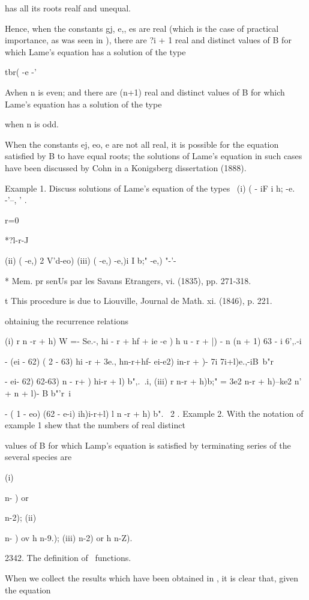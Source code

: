 {{{{has all its roots realf and unequal.

Hence, when the constants gj, e,, es are real (which is the case of
practical importance, as was seen in ), there are ?i + 1 real
and distinct values of B for which Lame's equation has a solution of
the type

tbr( -e -'

Avhen n is even; and there are (n+1) real and distinct values of B for
which Lame's equation has a solution of the type

when n is odd.

When the constants ej, eo, e are not all real, it is possible for the
equation satisfied by B to have equal roots; the solutions of Lame's
equation in such cases have been discussed by Cohn in a Konigsberg
dissertation (1888).

Example 1. Discuss solutions of Lame's equation of the types \ (i) ( -
iF i h; -e. -'--, ' .

r=0

*?l-r-J

(ii) ( -e,) 2 V'd-eo) (iii) ( -e,) -e,)i I b;" -e,) "-'-\

* Mem. pr senUs par les Savans Etrangers, vi. (1835), pp. 271-318.

t This procedure is due to Liouville, Journal de Math. xi. (1846), p.
221.

%
%

ohtainiug the recurrence relations

(i) r n -r + h) W =- Se.-, hi - r + hf + ie -e ) h u - r + |) - n (n +
1) 63 - i 6',.-i

- (ei - 62) ( 2 - 63) hi -r + %
3e., hn-r+hf- ei-e2) in-r + )- 7i 7i+l)e.,-iB\ b"r\,

- ei- 62) 62-63) n - r+ ) hi-r + l) b",.\ .i, (iii) r n-r + h)b;" =
3e2 n-r + h)--ke2 n' + n + l)- B b"'r\ i

- ( 1 - eo) (62 - e-i) ih)i-r+l) l n -r + h) b". \ 2 . Example 2. With
the notation of example 1 shew that the numbers of real distinct

values of B for which Lamp's equation is satisfied by terminating
series of the several species are

(i) \ \ {n- ) or \ \ {n-2); (ii) \ \ {n- ) ov h n-9.); (iii) n-2) or h
n-Z).

2342. The definition of \Lame\ functions.

When we collect the results which have been obtained in , it is
clear that, given the equation

}}}}}}}
